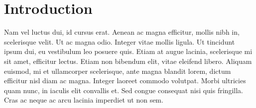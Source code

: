\section{Introduction}

Nam vel luctus dui, id cursus erat. Aenean ac magna efficitur, mollis nibh in, scelerisque velit. Ut ac magna odio. Integer vitae mollis ligula. Ut tincidunt ipsum dui, eu vestibulum leo posuere quis. Etiam at augue lacinia, scelerisque mi sit amet, efficitur lectus. Etiam non bibendum elit, vitae eleifend libero. Aliquam euismod, mi et ullamcorper scelerisque, ante magna blandit lorem, dictum efficitur nisl diam ac magna. Integer laoreet commodo volutpat. Morbi ultricies quam nunc, in iaculis elit convallis et. Sed congue consequat nisi quis fringilla. Cras ac neque ac arcu lacinia imperdiet ut non sem.

